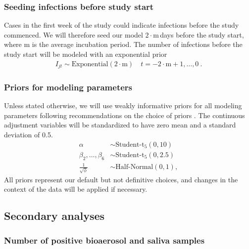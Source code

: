 \documentclass{article}
\begin{document}
\subsubsection*{Seeding infections before study start}

Cases in the first week of the study could indicate infections before the study commenced. We will therefore seed our model $2 \cdot \text{m}\,$days before the study start, where $\text{m}$ is the average incubation period. The number of infections before the study start will be modeled with an exponential prior
\begin{align*}
    I_{jt} \sim \text{Exponential}(2 \cdot \text{m}) \quad t = -2\cdot\text{m}+1, \dots, 0~. 
\end{align*}

\subsubsection*{Priors for modeling parameters}

Unless stated otherwise, we will use weakly informative priors for all modeling parameters following recommendations on the choice of priors \cite{Gelman2008-Scaling,Gelman2008-Logistic,Gelman2020,Stan2020,Gabry2023}. The continuous adjustment variables will be standardized to have zero mean and a standard deviation of 0.5. 
\begin{align*}
    \alpha &\sim \text{Student-t}_5(0, 10) \\
    \beta_2, \dots, \beta_6 &\sim \text{Student-t}_5(0, 2.5) \\
    \frac{1}{\sqrt{\phi}} &\sim \text{Half-Normal}(0,1),
\end{align*}
All priors represent our default but not definitive choices, and changes in the context of the data will be applied if necessary.


\subsection{Secondary analyses}

\subsubsection{Number of positive bioaerosol and saliva samples}
\end{document}
